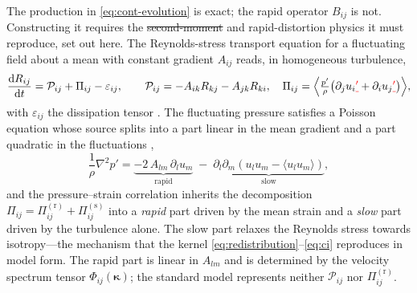 \documentclass[lineno]{JFM-FLM_Au}
\providecommand{\DIFadd}[1]{{\protect\color{blue}\uwave{#1}}} %
\providecommand{\DIFdel}[1]{{\protect\color{red}\sout{#1}}} %
\providecommand{\DIFaddbegin}{} %
\providecommand{\DIFaddend}{} %
\providecommand{\DIFdelbegin}{} %
\providecommand{\DIFdelend}{} %
\begin{document}
The production in \eqref{eq:cont-evolution} is exact; the rapid operator
$B_{ij}$ is not. Constructing it requires the \DIFdelbegin \DIFdel{second-moment }\DIFdelend \DIFaddbegin \DIFadd{Reynolds-stress }\DIFaddend and
rapid-distortion physics it must reproduce, set out here. The
Reynolds-stress transport equation for a fluctuating field about a
mean with constant gradient $A_{ij}$ reads, in homogeneous turbulence,
\begin{equation}
  \frac{\mathrm{d}R_{ij}}{\mathrm{d}t}
  = \mathcal{P}_{ij} + \Pi_{ij} - \varepsilon_{ij},
  \qquad
  \mathcal{P}_{ij}=-A_{ik}R_{kj}-A_{jk}R_{ki},
  \quad
  \Pi_{ij}=\Big\langle \tfrac{p'}{\rho}
            \big(\partial_j u_i\DIFdelbegin \DIFdel{'}\DIFdelend +\partial_i u_j\DIFdelbegin \DIFdel{'}\DIFdelend \big)\Big\rangle,
  \label{eq:rstransport}
\end{equation}
with $\varepsilon_{ij}$ the dissipation tensor \citep{Pope2000}. The
fluctuating pressure satisfies a Poisson equation whose source splits
into a part linear in the mean gradient and a part quadratic in the
fluctuations \citep{Pope2000},
\begin{equation}
  \frac{1}{\rho}\nabla^2 p'
  = \DIFdelbegin %
\DIFdelend \DIFaddbegin \underbrace{-2\,A_{lm}\,\partial_l u_m}\DIFaddend _{\text{rapid}}
    \;-\;
    \DIFdelbegin %
\DIFdelend \DIFaddbegin \underbrace{\partial_l\partial_m\!\left(u_l u_m
     -\langle u_l u_m\rangle\right)}\DIFaddend _{\text{slow}} ,
  \label{eq:poisson}
\end{equation}
and the pressure--strain correlation inherits the decomposition
$\Pi_{ij}=\Pi^{(\mathrm r)}_{ij}+\Pi^{(\mathrm s)}_{ij}$ into a
\emph{rapid} part driven by the mean strain and a \emph{slow} part driven
by the turbulence alone. The slow part relaxes the Reynolds stress
towards isotropy---the mechanism that the kernel
\eqref{eq:redistribution}--\eqref{eq:ci} reproduces in model form. The
rapid part is linear in $A_{lm}$ and is determined by the velocity
spectrum tensor $\Phi_{ij}(\boldsymbol{\kappa})$; the standard model
represents neither $\mathcal{P}_{ij}$ nor $\Pi^{(\mathrm r)}_{ij}$.
\end{document}
